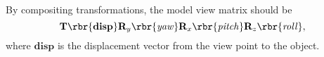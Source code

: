 \documentclass[english, nochinese]{../textmpls/pkupaper}
\begin{document}
\begin{thmquestion}
\
\begin{thmanswer}
By compositing transformations, the model view matrix should be
\begin{equation}
\mathbf{T} \rbr{\mathbf{disp}} \mathbf{R}_y \rbr{\mathit{yaw}} \mathbf{R}_x \rbr{\mathit{pitch}} \mathbf{R}_z \rbr{\mathit{roll}},
\end{equation}
where $\mathbf{disp}$ is the displacement vector from the view point to the object.
\end{thmanswer}
\end{thmquestion}
\end{document}
